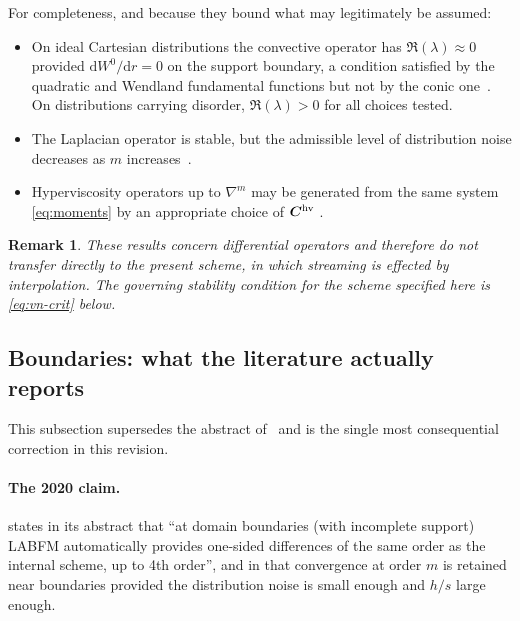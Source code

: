 \documentclass[11pt,a4paper]{article}
\newtheorem{remark}{Remark}
\begin{document}
For completeness, and because they bound what may legitimately be assumed:
\begin{itemize}
\item On ideal Cartesian distributions the convective operator has
$\Re(\lambda)\approx0$ provided $\mathrm dW^{0}/\mathrm dr=0$ on the support boundary,
a condition satisfied by the quadratic and Wendland fundamental functions but not by
the conic one~\cite[\S 4.2]{KLN2020}. On distributions carrying disorder,
$\Re(\lambda)>0$ for all choices tested.
\item The Laplacian operator is stable, but the admissible level of distribution noise
decreases as $m$ increases~\cite[\S 4.2, Table 1]{KLN2020}.
\item Hyperviscosity operators up to $\nabla^{m}$ may be generated from the same
system \eqref{eq:moments} by an appropriate choice of $\bm C^{\rm hv}$
\cite[Eq.~(25)]{KLN2020}.
\end{itemize}

\begin{remark}
These results concern \emph{differential} operators and therefore do not transfer
directly to the present scheme, in which streaming is effected by interpolation. The
governing stability condition for the scheme specified here is
\eqref{eq:vn-crit} below.
\end{remark}

\subsection{Boundaries: what the literature actually reports}
\label{sec:boundary}

This subsection supersedes the abstract of~\cite{KLN2020} and is the single most
consequential correction in this revision.

\paragraph{The 2020 claim.} \cite{KLN2020} states in its abstract that ``at domain
boundaries (with incomplete support) LABFM automatically provides one-sided differences
of the same order as the internal scheme, up to 4th order'', and in \cite[\S
IV\,A]{KLN2020} that convergence at order $m$ is retained near boundaries provided the
distribution noise is small enough and $h/s$ large enough.
\end{document}
